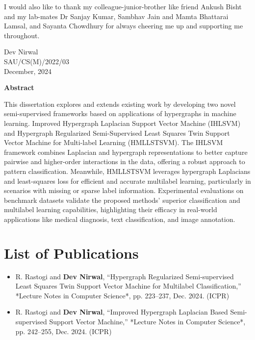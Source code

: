 \documentclass[12pt,a4paper,oneside,english]{report}
\begin{document}
I would also like to thank my colleague-junior-brother like friend Ankush Bisht and my lab-mates Dr Sanjay Kumar, Sambhav Jain and Mamta Bhattarai Lamsal, and Sayanta Chowdhury for always cheering me up and supporting me throughout.

\vspace{0.3cm}

\begin{flushright} 
	Dev Nirwal  \\
	SAU/CS(M)/2022/03 \\
	December, 2024
\end{flushright} 




\newpage
\begin{center}
	\huge{\textbf{Abstract}}\\[1.5cm]
\end{center}
This dissertation explores and extends existing work by developing two novel semi-supervised frameworks based on applications of hypergraphs in machine learning. Improved Hypergraph Laplacian Support Vector Machine (IHLSVM) and Hypergraph Regularized Semi-Supervised Least Squares Twin Support Vector Machine for Multi-label Learning (HMLLSTSVM). The IHLSVM framework combines Laplacian and hypergraph representations to better capture pairwise and higher-order interactions in the data, offering a robust approach to pattern classification. Meanwhile, HMLLSTSVM leverages hypergraph Laplacians and least-squares loss for efficient and accurate multilabel learning, particularly in scenarios with missing or sparse label information. Experimental evaluations on benchmark datasets validate the proposed methods' superior classification and multilabel learning capabilities, highlighting their efficacy in real-world applications like medical diagnosis, text classification, and image annotation.



\chapter*{List of Publications}
\normalsize %
\begin{itemize}
    \item R. Rastogi and \textbf{Dev Nirwal}, “Hypergraph Regularized Semi-supervised Least Squares Twin Support Vector Machine for Multilabel Classification,” *Lecture Notes in Computer Science*, pp. 223–237, Dec. 2024. (ICPR)  
    \item R. Rastogi and \textbf{Dev Nirwal}, “Improved Hypergraph Laplacian Based Semi-supervised Support Vector Machine,” *Lecture Notes in Computer Science*, pp. 242–255, Dec. 2024. (ICPR)
\end{itemize}
\end{document}
